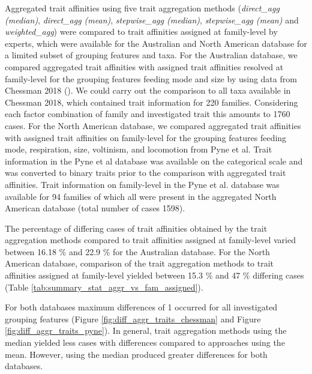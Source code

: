 \documentclass[../Draft_harmonization_paper.tex]{subfiles}
\begin{document}
Aggregated trait affinities using five trait aggregation methods (\textit{direct\_agg (median)}, \textit{direct\_agg (mean)}, \textit{stepwise\_agg (median)}, \textit{stepwise\_agg (mean)} and \textit{weighted\_agg}) were compared to trait affinities assigned at family-level by experts, which were available for the Australian and North American database for a limited subset of grouping features and taxa. For the Australian database, we compared aggregated trait affinities with assigned trait affinities resolved at family-level for the grouping features feeding mode and size by using data from Chessman 2018 (\cite{chessman_dissolved-oxygen_2018}). We could carry out the comparison to all taxa available in Chessman 2018, which contained trait information for 220 families. Considering each factor combination of family and investigated trait this amounts to 1760 cases. For the North American database, we compared aggregated trait affinities with assigned trait affinities on family-level for the grouping features feeding mode, respiration, size, voltinism, and locomotion from Pyne et al. Trait information in the Pyne et al database was available on the categorical scale and was converted to binary traits prior to the comparison with aggregated trait affinities. Trait information on family-level in the Pyne et al. database was available for 94 families of which all were present in the aggregated North American database (total number of cases 1598).

The percentage of differing cases of trait affinities obtained by the trait aggregation methods compared to trait affinities assigned at family-level varied between 16.18 \% and 22.9 \% for the Australian database. For the North American database, comparison of the trait aggregation methods to trait affinities assigned at family-level yielded between 15.3 \% and 47 \% differing cases (Table \ref{tab:summary_stat_aggr_vs_fam_assigned}).

For both databases maximum differences of 1 occurred for all investigated grouping features (Figure \ref{fig:diff_aggr_traits_chessman} and Figure \ref{fig:diff_aggr_traits_pyne}). In general, trait aggregation methods using the median yielded less cases with differences compared to approaches using the mean. However, using the median produced greater differences for both databases. 
\end{document}
